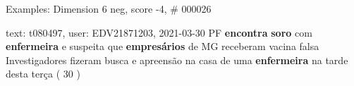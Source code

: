 \begin{frame}{Examples: Dimension 6 neg, score -4, \# 000026}
\footnotesize
\begin{alertblock}{text: t080497, user: EDV21871203, 2021-03-30}
PF \textbf{encontra} \textbf{soro} com \textbf{enfermeira} e suspeita que 
\textbf{empresários} de MG receberam vacina falsa Investigadores fizeram busca 
e apreensão na casa de uma \textbf{enfermeira} na tarde desta terça ( 30 ) 
\end{alertblock}
\end{frame}
